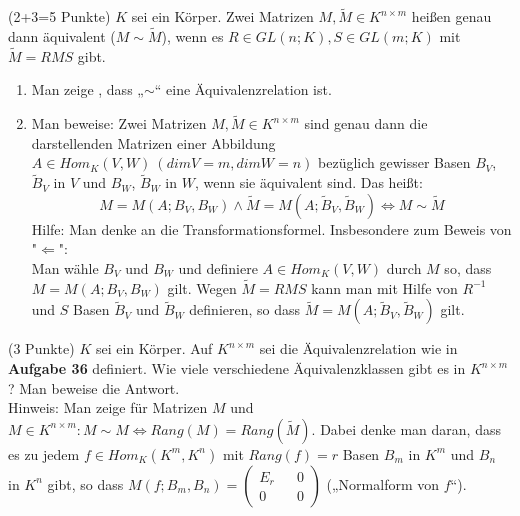 \documentclass{uebblatt}
\begin{document}

\begin{aufgabe}{ (2+3=5 Punkte)}
$K$ sei ein Körper. Zwei Matrizen $M, \widetilde{M} \in K^{n \times m}$ heißen genau dann äquivalent ($M \sim \widetilde{M}$), wenn es $R \in GL(n; K), S \in GL(m; K)$ mit $\widetilde{M} = RMS$ gibt.
\begin{enumerate}
\item Man zeige , dass „$\sim$“ eine Äquivalenzrelation ist.
\item Man beweise: Zwei Matrizen $M, \widetilde{M} \in K^{n \times m}$ sind genau dann die darstellenden Matrizen einer Abbildung $A \in Hom_K(V, W) \> (dimV = m, dimW = n)$ bezüglich gewisser Basen $B_V$, $\widetilde{B}_V$ in $V$ und $B_W$, $\widetilde{B}_W$ in $W$, wenn sie äquivalent sind. Das heißt:
$$M = M(A; B_V, B_W) \land \widetilde{M} = M(A; \widetilde{B}_V, \widetilde{B}_W) \Leftrightarrow M \sim \widetilde{M}$$
Hilfe: Man denke an die Transformationsformel. Insbesondere zum Beweis von "$\Leftarrow$":\\
Man wähle $B_V$ und $B_W$ und definiere $A \in Hom_K(V, W)$ durch $M$ so, dass\break 
$M = M(A; B_V, B_W)$ gilt. Wegen $\widetilde{M} = RMS$ kann man mit Hilfe von $R^{-1}$ und $S$ Basen $\widetilde{B}_V$ und $\widetilde{B}_W$ definieren, so dass $\widetilde{M} = M(A; \widetilde{B}_V, \widetilde{B}_W)$ gilt.
\end{enumerate}
\end{aufgabe}


\begin{aufgabe}{ (3 Punkte)}
$K$ sei ein Körper. Auf $K^{n \times m}$ sei die Äquivalenzrelation wie in \textbf{Aufgabe 36} definiert. Wie viele verschiedene Äquivalenzklassen gibt es in $K^{n \times m}$? Man beweise die Antwort.\vspace{2mm} \\
Hinweis: Man zeige für Matrizen $M$ und $M \in K^{n \times m}: M \sim M \Leftrightarrow Rang(M) = Rang(\widetilde{M})$. Dabei denke man daran, dass es zu jedem $f \in Hom_K(K^m, K^n)$ mit $Rang(f) = r$ Basen $B_m$ in $K^m$ und $B_n$ in $K^n$ gibt, so dass $M(f; B_m, B_n) = 
\begin{pmatrix} E_r && 0 \\ 0 && 0 \end{pmatrix}$ („Normalform von $f$“).

\end{aufgabe}
\end{document}
